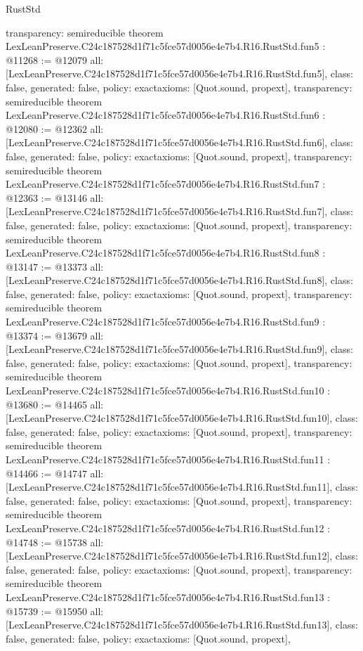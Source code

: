 \begin{lexlean}{RustStd}
\begin{coremodule}
{  transparency: semireducible
}
theorem LexLeanPreserve.C24c187528d1f71c5fce57d0056e4e7b4.R16.RustStd.fun5 : @11268 := @12079 {
  all: [LexLeanPreserve.C24c187528d1f71c5fce57d0056e4e7b4.R16.RustStd.fun5],
  class: false,
  generated: false,
  policy: exact{axioms: [Quot.sound, propext]},
  transparency: semireducible
}
theorem LexLeanPreserve.C24c187528d1f71c5fce57d0056e4e7b4.R16.RustStd.fun6 : @12080 := @12362 {
  all: [LexLeanPreserve.C24c187528d1f71c5fce57d0056e4e7b4.R16.RustStd.fun6],
  class: false,
  generated: false,
  policy: exact{axioms: [Quot.sound, propext]},
  transparency: semireducible
}
theorem LexLeanPreserve.C24c187528d1f71c5fce57d0056e4e7b4.R16.RustStd.fun7 : @12363 := @13146 {
  all: [LexLeanPreserve.C24c187528d1f71c5fce57d0056e4e7b4.R16.RustStd.fun7],
  class: false,
  generated: false,
  policy: exact{axioms: [Quot.sound, propext]},
  transparency: semireducible
}
theorem LexLeanPreserve.C24c187528d1f71c5fce57d0056e4e7b4.R16.RustStd.fun8 : @13147 := @13373 {
  all: [LexLeanPreserve.C24c187528d1f71c5fce57d0056e4e7b4.R16.RustStd.fun8],
  class: false,
  generated: false,
  policy: exact{axioms: [Quot.sound, propext]},
  transparency: semireducible
}
theorem LexLeanPreserve.C24c187528d1f71c5fce57d0056e4e7b4.R16.RustStd.fun9 : @13374 := @13679 {
  all: [LexLeanPreserve.C24c187528d1f71c5fce57d0056e4e7b4.R16.RustStd.fun9],
  class: false,
  generated: false,
  policy: exact{axioms: [Quot.sound, propext]},
  transparency: semireducible
}
theorem LexLeanPreserve.C24c187528d1f71c5fce57d0056e4e7b4.R16.RustStd.fun10 : @13680 := @14465 {
  all: [LexLeanPreserve.C24c187528d1f71c5fce57d0056e4e7b4.R16.RustStd.fun10],
  class: false,
  generated: false,
  policy: exact{axioms: [Quot.sound, propext]},
  transparency: semireducible
}
theorem LexLeanPreserve.C24c187528d1f71c5fce57d0056e4e7b4.R16.RustStd.fun11 : @14466 := @14747 {
  all: [LexLeanPreserve.C24c187528d1f71c5fce57d0056e4e7b4.R16.RustStd.fun11],
  class: false,
  generated: false,
  policy: exact{axioms: [Quot.sound, propext]},
  transparency: semireducible
}
theorem LexLeanPreserve.C24c187528d1f71c5fce57d0056e4e7b4.R16.RustStd.fun12 : @14748 := @15738 {
  all: [LexLeanPreserve.C24c187528d1f71c5fce57d0056e4e7b4.R16.RustStd.fun12],
  class: false,
  generated: false,
  policy: exact{axioms: [Quot.sound, propext]},
  transparency: semireducible
}
theorem LexLeanPreserve.C24c187528d1f71c5fce57d0056e4e7b4.R16.RustStd.fun13 : @15739 := @15950 {
  all: [LexLeanPreserve.C24c187528d1f71c5fce57d0056e4e7b4.R16.RustStd.fun13],
  class: false,
  generated: false,
  policy: exact{axioms: [Quot.sound, propext]},
}
\end{coremodule}
\end{lexlean}
